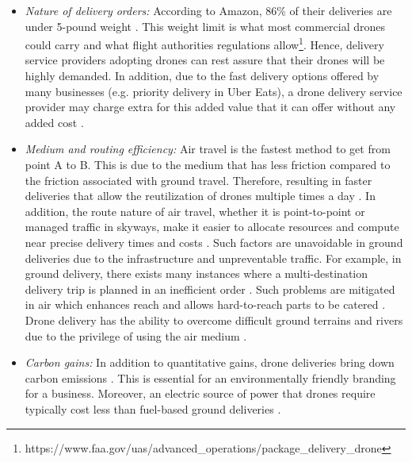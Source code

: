 \documentclass[conference]{IEEEtran}
\begin{document}
\begin{itemize}[leftmargin=*]
\begin{itemize}
    \item \textit{Nature of delivery orders:} According to Amazon, 86\% of their deliveries are under 5-pound weight \cite{pierce2013delivery}. This weight limit is what most commercial drones could carry and what flight authorities regulations allow\footnote{https://www.faa.gov/uas/advanced\_operations/package\_delivery\_drone}. Hence, delivery service providers adopting drones can rest assure that their drones will be highly demanded. In addition, due to the fast delivery options offered by many businesses (e.g. priority delivery in Uber Eats), a drone delivery service provider may charge extra for this added value that it can offer without any added cost \cite{sudbury2016cost}. 
    
        
    \item \textit{Medium and routing efficiency:} Air travel is the fastest method to get from point A to B. This is due to the medium that has less friction compared to the friction associated with ground travel. Therefore, resulting in faster deliveries that allow the reutilization of drones multiple times a day \cite{alkouz2021provider}. In addition, the route nature of air travel, whether it is point-to-point or managed traffic in skyways, make it easier to allocate resources and compute near precise delivery times and costs \cite{shahzaad2019constraint}. Such factors are unavoidable in ground deliveries due to the infrastructure and unpreventable traffic. For example, in ground delivery, there exists many instances where a multi-destination delivery trip is planned in an inefficient order \cite{wang2019vehicle}. Such problems are mitigated in air which enhances reach and allows hard-to-reach parts to be catered \cite{shahzaad2019composing}. Drone delivery has the ability to overcome difficult ground terrains and rivers due to the privilege of using the air medium \cite{YOO20181687}.



    \item \textit{Carbon gains:} In addition to quantitative gains, drone deliveries bring down carbon emissions \cite{goodchild2018delivery}. This is essential for an environmentally friendly branding for a business. Moreover, an electric source of power that drones require typically cost less than fuel-based ground deliveries \cite{chiang2019impact}.
\end{itemize}
    

\end{itemize}
\end{document}
